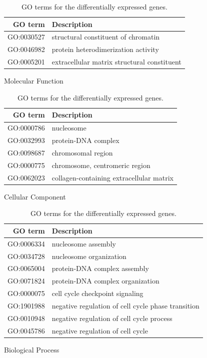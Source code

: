 \begin{table}[hbt]
	\centering
	\begin{subtable}[h]{0.49\textwidth}
		\centering
  		\begin{tabular}{r|p{4cm}}
    		\textbf{GO term} & \textbf{Description}\\
    		\hline
    		GO:0030527 & structural constituent of chromatin\\
    		GO:0046982 & protein heterodimerization activity\\
    		GO:0005201 & extracellular matrix structural constituent\\
  		\end{tabular}
  		\caption{Molecular Function}
  	\end{subtable}
  	\hfill
  	\begin{subtable}[h]{0.49\textwidth}
  		\centering
  		\begin{tabular}{r|p{4cm}}
  		 \textbf{GO term} & \textbf{Description}\\
  		 \hline
  		 GO:0000786 & nucleosome \\
  		 GO:0032993 & protein-DNA complex \\
  		 GO:0098687& chromosomal region\\
  		 GO:0000775 & chromosome, centromeric region\\
  		 GO:0062023 & collagen-containing extracellular matrix\\
  		\end{tabular}	
  		\caption{Cellular Component}
  	\end{subtable}
  	\hfill
  	\begin{subtable}[t]{\textwidth}
  		\centering
  		\begin{tabular}{r|p{8cm}}
  		 \textbf{GO term} & \textbf{Description}\\
  		 \hline
  		 GO:0006334 & nucleosome assembly \\
  		 GO:0034728 & nucleosome organization \\
  		 GO:0065004 & protein-DNA complex assembly\\
  		 GO:0071824 & protein-DNA complex organization \\
  		 GO:0000075 & cell cycle checkpoint signaling\\
  		 GO:1901988 & negative regulation of cell cycle phase transition\\
  		 GO:0010948 & negative regulation of cell cycle process\\
  		 GO:0045786 & negative regulation of cell cycle\\
  		\end{tabular}	
  		\caption{Biological Process}
  	\end{subtable}
  	\hfill
  	\vfill
  \caption{GO terms for the differentially expressed genes.}
  \label{table:go-all-DEG}
\end{table}


